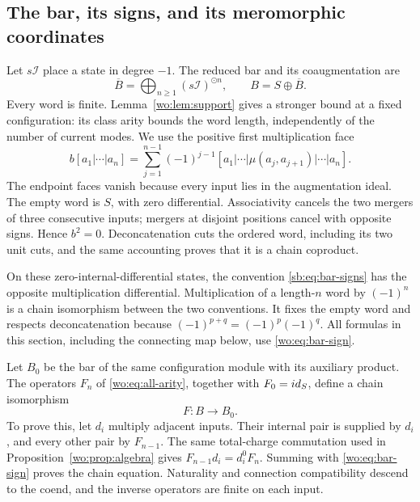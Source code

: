 \subsection{The bar, its signs, and its meromorphic coordinates}

Let \(s\mathcal I\) place a state in degree \(-1\).  The reduced
bar and its coaugmentation are
\[
 \overline B=\bigoplus_{n\ge1}(s\mathcal I)^{\odot n},\qquad
 B=S\oplus\overline B.
\]
Every word is finite.  Lemma~\ref{wo:lem:support} gives a stronger
bound at a fixed configuration: its class arity bounds the word
length, independently of the number of current modes.
We use the positive first multiplication face
\begin{equation}\label{wo:eq:bar-sign}
 b[a_1|\cdots|a_n]
 =\sum_{j=1}^{n-1}(-1)^{j-1}
 [a_1|\cdots|\mu(a_j,a_{j+1})|\cdots|a_n].
\end{equation}
The endpoint faces vanish because every input lies in the
augmentation ideal.  The empty word is \(S\), with zero differential.
Associativity cancels the two mergers of three consecutive inputs;
mergers at disjoint positions cancel with opposite signs.  Hence
\(b^2=0\).  Deconcatenation cuts the ordered word, including its two
unit cuts, and the same accounting proves that it is a chain coproduct.

On these zero-internal-differential states, the convention
\eqref{sb:eq:bar-signs} has the opposite multiplication differential.
Multiplication of a length-\(n\) word by \((-1)^n\) is a chain
isomorphism between the two conventions.  It fixes the empty word
and respects deconcatenation because \((-1)^{p+q}=(-1)^p(-1)^q\).
All formulas in this section, including the connecting map below,
use \eqref{wo:eq:bar-sign}.

Let \(B_0\) be the bar of the same configuration module with its
auxiliary product.  The operators \(F_n\) of
\eqref{wo:eq:all-arity}, together with \(F_0=id_S\), define a
chain isomorphism
\begin{equation}\label{wo:eq:bar-intertwiner}
 F:B\longrightarrow B_0.
\end{equation}
To prove this, let \(d_i\) multiply adjacent inputs.  Their internal
pair is supplied by \(d_i\), and every other pair by \(F_{n-1}\).
The same total-charge commutation used in
Proposition~\ref{wo:prop:algebra} gives
\(F_{n-1}d_i=d_i^0F_n\).  Summing with
\eqref{wo:eq:bar-sign} proves the chain equation.  Naturality and
connection compatibility descend to the coend, and the inverse
operators are finite on each input.

